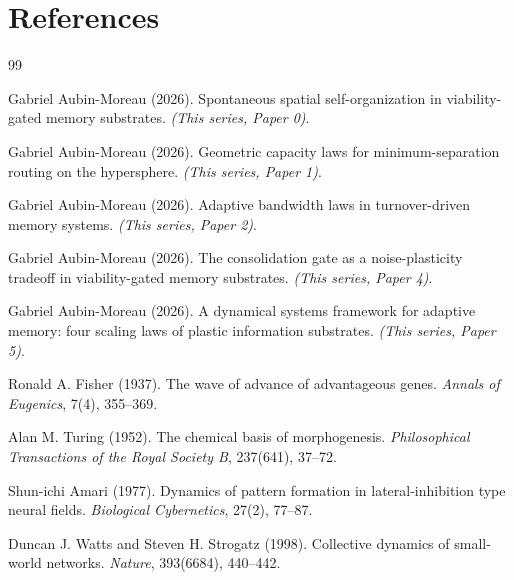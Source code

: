 \documentclass[11pt]{article}
\begin{document}
\section*{References}

\begin{thebibliography}{99}

Gabriel Aubin-Moreau (2026).
Spontaneous spatial self-organization in viability-gated memory substrates.
\textit{(This series, Paper 0)}.

Gabriel Aubin-Moreau (2026).
Geometric capacity laws for minimum-separation routing on the hypersphere.
\textit{(This series, Paper 1)}.

Gabriel Aubin-Moreau (2026).
Adaptive bandwidth laws in turnover-driven memory systems.
\textit{(This series, Paper 2)}.

Gabriel Aubin-Moreau (2026).
The consolidation gate as a noise-plasticity tradeoff in viability-gated memory substrates.
\textit{(This series, Paper 4)}.

Gabriel Aubin-Moreau (2026).
A dynamical systems framework for adaptive memory: four scaling laws of plastic information substrates.
\textit{(This series, Paper 5)}.

Ronald A. Fisher (1937).
The wave of advance of advantageous genes.
\textit{Annals of Eugenics}, 7(4), 355--369.

Alan M. Turing (1952).
The chemical basis of morphogenesis.
\textit{Philosophical Transactions of the Royal Society B}, 237(641), 37--72.

Shun-ichi Amari (1977).
Dynamics of pattern formation in lateral-inhibition type neural fields.
\textit{Biological Cybernetics}, 27(2), 77--87.

Duncan J. Watts and Steven H. Strogatz (1998).
Collective dynamics of small-world networks.
\textit{Nature}, 393(6684), 440--442.

\end{thebibliography}
\end{document}
